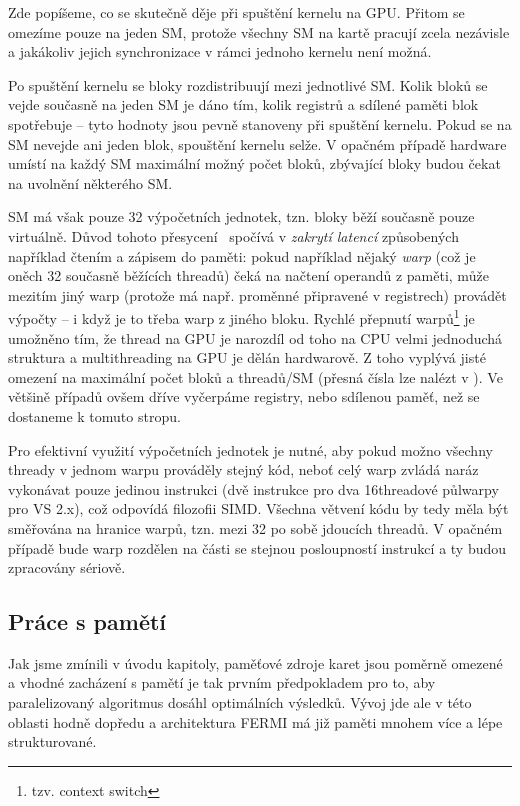     Zde popíšeme, co se skutečně děje při spuštění kernelu na GPU. Přitom se omezíme pouze na jeden SM, protože všechny SM na kartě pracují zcela nezávisle a jakákoliv jejich synchronizace v rámci jednoho kernelu není možná.

    Po spuštění kernelu se bloky rozdistribuují mezi jednotlivé SM. Kolik bloků se vejde současně na jeden SM je dáno tím, kolik registrů a sdílené paměti blok spotřebuje -- tyto hodnoty jsou pevně stanoveny při spuštění kernelu. Pokud se na SM nevejde ani jeden blok, spouštění kernelu selže. V opačném případě hardware umístí na každý SM maximální možný počet bloků, zbývající bloky budou čekat na uvolnění některého SM.

    SM má však pouze 32 výpočetních jednotek, tzn. bloky běží současně pouze virtuálně. Důvod tohoto \bq přesycení\eq~ spočívá v \emph{zakrytí latencí} způsobených například čtením a zápisem do paměti: pokud například nějaký \emph{warp} (což je oněch 32 současně běžících threadů) čeká na načtení operandů z paměti, může mezitím jiný warp (protože má např. proměnné připravené v registrech) provádět výpočty -- i když je to třeba warp z jiného bloku. Rychlé přepnutí warpů\footnote{tzv. context switch} je umožněno tím, že thread na GPU je narozdíl od toho na CPU velmi jednoduchá struktura a multithreading na GPU je dělán hardwarově. Z toho vyplývá jisté omezení na maximální počet bloků a threadů/SM (přesná čísla lze nalézt v \cite{CUDA programming g.}). Ve většině případů ovšem dříve vyčerpáme registry, nebo sdílenou paměť, než se dostaneme k tomuto stropu.

    Pro efektivní využití výpočetních jednotek je nutné, aby pokud možno všechny thready v jednom warpu prováděly stejný kód, neboť celý warp zvládá naráz vykonávat pouze jedinou instrukci (dvě instrukce pro dva 16threadové půlwarpy pro VS 2.x), což odpovídá filozofii SIMD. Všechna větvení kódu by tedy měla být směřována na hranice warpů, tzn. mezi 32 po sobě jdoucích threadů. V opačném případě bude warp rozdělen na části se stejnou posloupností instrukcí a ty budou zpracovány sériově.

    \subsection{Práce s pamětí}

    Jak jsme zmínili v úvodu kapitoly, paměťové zdroje karet jsou poměrně omezené a vhodné zacházení s pamětí je tak prvním předpokladem pro to, aby paralelizovaný algoritmus dosáhl optimálních výsledků. Vývoj jde ale v této oblasti hodně dopředu a architektura FERMI má již paměti mnohem více a lépe strukturované.

